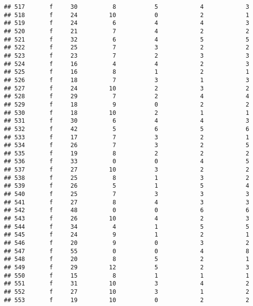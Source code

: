 \documentclass[
]{article}
\begin{document}
\begin{verbatim}
## 517       f     30          8           5            4            3
## 518       f     24         10           0            2            1
## 519       f     24          6           4            4            3
## 520       f     21          7           4            2            2
## 521       f     32          6           4            5            5
## 522       f     25          7           3            2            2
## 523       f     23          7           2            3            3
## 524       f     16          4           4            2            3
## 525       f     16          8           1            2            1
## 526       f     18          7           3            1            3
## 527       f     24         10           2            3            2
## 528       f     29          7           2            4            4
## 529       f     18          9           0            2            2
## 530       f     18         10           2            1            1
## 531       f     30          6           4            4            3
## 532       f     42          5           6            5            6
## 533       f     17          7           3            2            1
## 534       f     26          7           3            2            5
## 535       f     19          8           2            2            2
## 536       f     33          0           0            4            5
## 537       f     27         10           3            2            2
## 538       f     25          8           1            3            2
## 539       f     26          5           1            5            4
## 540       f     25          7           3            3            3
## 541       f     27          8           4            3            3
## 542       f     48          0           0            6            6
## 543       f     26         10           4            2            3
## 544       f     34          4           1            5            5
## 545       f     24          9           1            2            1
## 546       f     20          9           0            3            2
## 547       f     55          0           0            4            8
## 548       f     20          8           5            2            1
## 549       f     29         12           5            2            3
## 550       f     15          8           1            1            1
## 551       f     31         10           3            4            2
## 552       f     27         10           3            1            2
## 553       f     19         10           0            2            2

\end{verbatim}
\end{document}
